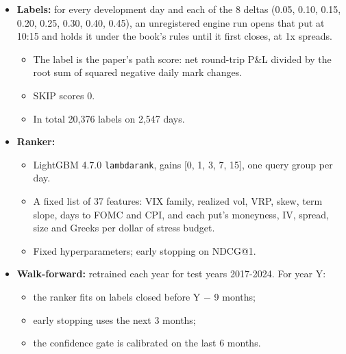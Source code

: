 \documentclass{article}
\begin{document}
\begin{itemize}
\item \textbf{Labels:} for every development day and each of the 8 deltas (0.05, 0.10, 0.15, 0.20, 0.25, 0.30, 0.40, 0.45), an unregistered engine run opens that put at 10:15 and holds it under the book's rules until it first closes, at 1x spreads.

\begin{itemize}

\item The label is the paper's path score: net round-trip P\&L divided by the root sum of squared negative daily mark changes.

\item SKIP scores 0.

\item In total 20,376 labels on 2,547 days.

\end{itemize}

\item \textbf{Ranker:}

\begin{itemize}

\item LightGBM 4.7.0 \texttt{lambdarank}, gains [0, 1, 3, 7, 15], one query group per day.

\item A fixed list of 37 features: VIX family, realized vol, VRP, skew, term slope, days to FOMC and CPI, and each put's moneyness, IV, spread, size and Greeks per dollar of stress budget.

\item Fixed hyperparameters; early stopping on NDCG@1.

\end{itemize}

\item \textbf{Walk-forward:} retrained each year for test years 2017-2024. For year Y:

\begin{itemize}

\item the ranker fits on labels closed before Y \ensuremath{-} 9 months;

\item early stopping uses the next 3 months;

\item the confidence gate is calibrated on the last 6 months.

\end{itemize}


\end{itemize}
\end{document}
